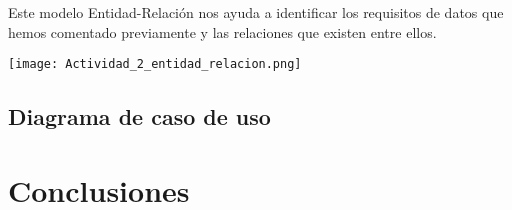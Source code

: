 \documentclass{\ClassPath/viu-tfm-template}
\begin{document}
Este modelo Entidad-Relación nos ayuda a identificar los requisitos de datos que hemos comentado previamente y las relaciones que existen entre ellos.

\texttt{[image: Actividad\_2\_entidad\_relacion.png]}


\section{Diagrama de caso de uso}


\chapter{Conclusiones}


\printbibliography[title={Referencias bibliográficas},heading=bibintoc]
\end{document}
